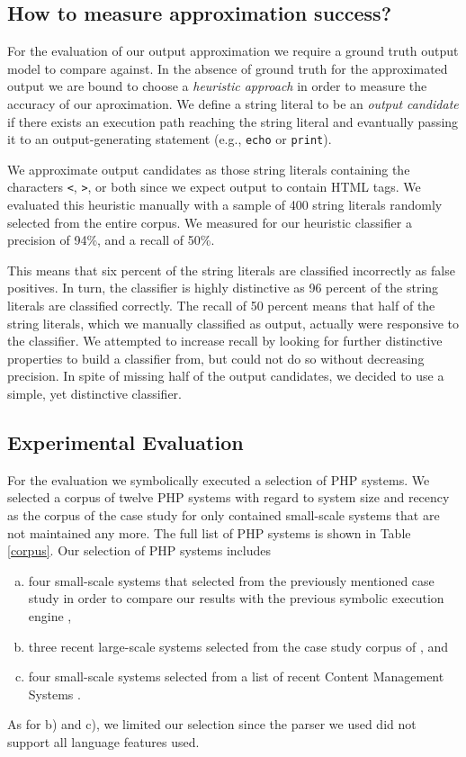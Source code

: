 \documentclass[preprint]{sig-alternate-05-2015}
\begin{document}
\subsection{How to measure approximation success?} \label{heuristic}
For the evaluation of our output approximation we require a ground truth output model to compare against.
In the absence of ground truth for the approximated output we are bound to choose a \emph{heuristic approach} in order to measure the accuracy of our aproximation. We define a string literal to be an \emph{output candidate} if there exists an execution path reaching the string literal and evantually passing it to an 
output-generating statement (e.g., \texttt{echo} or \texttt{print}).

We approximate output candidates as those string literals containing the characters \texttt{<}, \texttt{>}, or both since we expect output to contain HTML tags. We evaluated this heuristic manually
with a sample of 400 string literals randomly selected from the entire corpus.
We measured for our heuristic classifier a precision of 94\%, and a recall of 50\%.
 
This means that six percent of the string literals are classified incorrectly as false positives. In turn, the classifier is highly distinctive as 96 percent of the string literals are classified correctly. The recall of 50 percent means that half of the string literals, which we manually classified as output, actually were responsive to the classifier. We attempted to increase recall by looking for further distinctive properties to build a classifier from, but could not do so without decreasing precision. In spite of missing half of the output candidates, we decided to use a simple, yet distinctive classifier.

\subsection{Experimental Evaluation} 
For the evaluation we symbolically executed a selection of PHP systems. We selected a corpus of twelve PHP systems with regard to system size and recency as the corpus of the case study for \cite{Nguyen:2014:BCG:2635868.2635928} only contained small-scale systems that are not maintained any more. The full list of PHP systems is shown in Table \ref{corpus}. Our selection of PHP systems includes
\begin{enumerate}[a)]
\item four small-scale systems that selected from the previously mentioned case study in order to compare our results with the previous symbolic execution engine \cite{Nguyen:2014:BCG:2635868.2635928},
\item three recent large-scale systems selected from the case study corpus of \cite{Hills:2013:ESP:2483760.2483786}, and
\item four small-scale systems selected from a list of recent Content Management Systems \cite{codegeekz}.
\end{enumerate}
As for b) and c), we limited our selection since the parser we used did not support all language features used.
\end{document}
